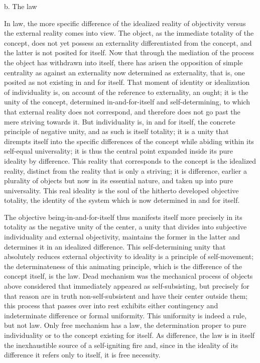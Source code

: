 b. The law

In law, the more specific difference of
the idealized reality of objectivity
versus the external reality comes into view.
The object, as the immediate totality of the concept,
does not yet possess an externality
differentiated from the concept,
and the latter is not posited for itself.
Now that through the mediation of the process
the object has withdrawn into itself,
there has arisen the opposition of
simple centrality as against an externality
now determined as externality,
that is, one posited as not existing in and for itself.
That moment of identity or idealization of individuality is,
on account of the reference to externality, an ought;
it is the unity of the concept,
determined in-and-for-itself and self-determining,
to which that external reality does not correspond,
and therefore does not go past the mere striving towards it.
But individuality is, in and for itself,
the concrete principle of negative unity,
and as such is itself totality;
it is a unity that dirempts itself
into the specific differences of the concept
while abiding within its self-equal universality;
it is thus the central point expanded
inside its pure ideality by difference.
This reality that corresponds to the concept is
the idealized reality,
distinct from the reality that is only a striving;
it is difference, earlier a plurality of objects
but now in its essential nature,
and taken up into pure universality.
This real ideality is the soul of
the hitherto developed objective totality,
the identity of the system
which is now determined in and for itself.

The objective being-in-and-for-itself
thus manifests itself more precisely
in its totality as the negative unity of the center,
a unity that divides into
subjective individuality and external objectivity,
maintains the former in the latter
and determines it in an idealized difference.
This self-determining unity that absolutely
reduces external objectivity to ideality
is a principle of self-movement;
the determinateness of this animating principle,
which is the difference of the concept itself, is the law.
Dead mechanism was the mechanical process of objects
above considered that immediately appeared as self-subsisting,
but precisely for that reason are in truth non-self-subsistent
and have their center outside them;
this process that passes over into rest
exhibits either contingency and indeterminate difference
or formal uniformity.
This uniformity is indeed a rule, but not law.
Only free mechanism has a law,
the determination proper to pure individuality
or to the concept existing for itself.
As difference, the law is in itself
the inexhaustible source of a self-igniting fire
and, since in the ideality of its difference
it refers only to itself,
it is free necessity.

